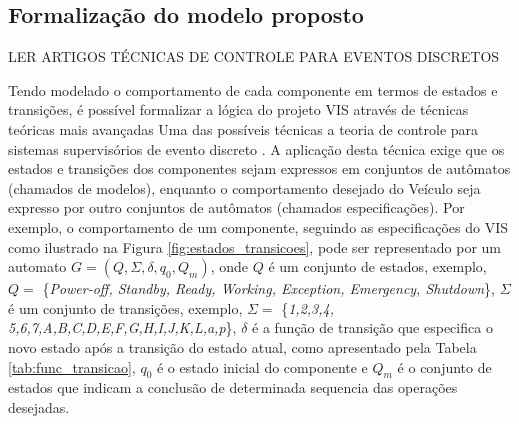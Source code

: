\documentclass[conference]{IEEEtran}
\begin{document}
\subsection{Formalização do modelo proposto}\label{subsec:formal_synthesis}

LER ARTIGOS TÉCNICAS DE CONTROLE PARA EVENTOS DISCRETOS

Tendo modelado o comportamento de cada componente em termos de estados e transições, é possível formalizar a lógica do projeto VIS através de técnicas teóricas mais avançadas Uma das possíveis técnicas a teoria de controle para sistemas supervisórios de evento discreto \cite{Event_Systems}. A aplicação desta técnica exige que os estados e transições dos componentes sejam expressos em conjuntos de autômatos (chamados de modelos), enquanto o comportamento desejado do Veículo seja expresso por outro conjuntos de autômatos (chamados especificações). Por exemplo, o comportamento de um componente, seguindo as especificações do VIS como ilustrado na Figura \ref{fig:estados_transicoes}, pode ser representado por um automato $G = (Q,\Sigma,\delta,q_{0},Q_{m})$, onde $Q$ é um conjunto de estados, exemplo, $Q =$ \{\textit{Power-off, Standby, Ready, Working, Exception, Emergency, Shutdown}\}, $\Sigma$ é um conjunto de transições, exemplo, $\Sigma =$ \{\textit{1,2,3,4, 5,6,7,A,B,C,D,E,F,G,H,I,J,K,L,a,p}\}, $\delta$ é a função de transição que especifica o novo estado após a transição do estado atual, como apresentado pela Tabela \ref{tab:func_transicao}, $q_{0}$ é o estado inicial do componente e $Q_{m}$ é o conjunto de estados que indicam a conclusão de determinada sequencia das operações desejadas.
\end{document}
